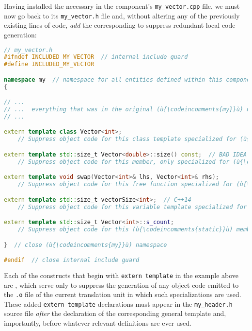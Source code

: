 Having installed the necessary  in the component's \lstinline!my_vector.cpp! file, we
must now go back to its \lstinline!my_vector.h! file and, without altering
any of the previously existing lines of code, \emph{add} the
corresponding  to
suppress redundant local code generation:

\begin{lstlisting}[language=C++]
// my_vector.h
#ifndef INCLUDED_MY_VECTOR  // internal include guard
#define INCLUDED_MY_VECTOR

namespace my  // namespace for all entities defined within this component
{

// ...
// ...  everything that was in the original (ù{\codeincomments{my}}ù) namespace
// ...

extern template class Vector<int>;
    // Suppress object code for this class template specialized for (ù{\codeincomments{int}}ù).

extern template std::size_t Vector<double>::size() const;  // BAD IDEA
    // Suppress object code for this member, only specialized for (ù{\codeincomments{double}}ù).

extern template void swap(Vector<int>& lhs, Vector<int>& rhs);
    // Suppress object code for this free function specialized for (ù{\codeincomments{int}}ù).

extern template std::size_t vectorSize<int>;  // C++14
    // Suppress object code for this variable template specialized for (ù{\codeincomments{int}}ù).

extern template std::size_t Vector<int>::s_count;
    // Suppress object code for this (ù{\codeincomments{static}}ù) member definition w.r.t. (ù{\codeincomments{int}}ù).

}  // close (ù{\codeincomments{my}}ù) namespace

#endif  // close internal include guard
\end{lstlisting}
    
\noindent Each of the constructs that begin with \lstinline!extern!~\lstinline!template!
in the example above are , which serve only to suppress the generation of any
object code emitted to the \lstinline!.o! file of the current translation
unit in which such specializations are used. These added
\lstinline!extern!~\lstinline!template! declarations must appear in the
\lstinline!my_header.h! source file \emph{after} the declaration of the
corresponding general template and, importantly, before whatever
relevant definitions are ever used.

